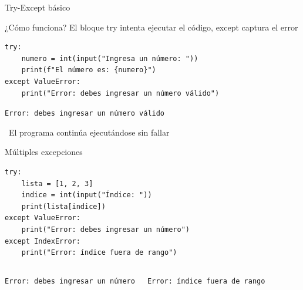 \documentclass{beamer}
\begin{document}
\begin{frame}[fragile]{Try-Except básico \faShieldAlt}
\begin{conceptbox}{¿Cómo funciona?}
El bloque try intenta ejecutar el código, except captura el error
\end{conceptbox}

\begin{lstlisting}
try:
    numero = int(input("Ingresa un número: "))
    print(f"El número es: {numero}")
except ValueError:
    print("Error: debes ingresar un número válido")
\end{lstlisting}

\vspace{-0.2cm}
\begin{tcolorbox}[colback=green!10,colframe=green,title={\small\faArrowCircleRight \ Salida (entrada: 'abc')},coltitle=fg0,left=3pt,right=3pt,top=2pt,bottom=2pt,boxsep=1pt]
\small\texttt{Error: debes ingresar un número válido}
\end{tcolorbox}

\vspace{-0.1cm}
\begin{notebox}
\small\faCheckCircle\ El programa continúa ejecutándose sin fallar
\end{notebox}
\end{frame}

\begin{frame}[fragile]{Múltiples excepciones \faLayerGroup}
\begin{lstlisting}
try:
    lista = [1, 2, 3]
    indice = int(input("Índice: "))
    print(lista[indice])
except ValueError:
    print("Error: debes ingresar un número")
except IndexError:
    print("Error: índice fuera de rango")
\end{lstlisting}

\vspace{-0.2cm}
\begin{columns}[T]
\begin{tcolorbox}[colback=blue!10,colframe=blue,title={\small\faArrowDown \ Entrada: 'abc'},coltitle=fg0,left=2pt,right=2pt,top=2pt,bottom=2pt]
\small\texttt{Error: debes ingresar un número}
\end{tcolorbox}

\begin{tcolorbox}[colback=blue!10,colframe=blue,title={\small\faArrowDown \ Entrada: 10},coltitle=fg0,left=2pt,right=2pt,top=2pt,bottom=2pt]
\small\texttt{Error: índice fuera de rango}
\end{tcolorbox}
\end{columns}
\end{frame}
\end{document}
